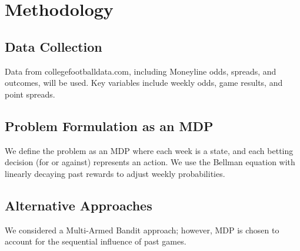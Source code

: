 \section{Methodology}
    \subsection{Data Collection}
    Data from collegefootballdata.com, including Moneyline odds, spreads, and outcomes, will be used. Key variables include weekly odds, game results, and point spreads.

    \subsection{Problem Formulation as an MDP}
    We define the problem as an MDP where each week is a state, and each betting decision (for or against) represents an action. We use the Bellman equation with linearly decaying past rewards to adjust weekly probabilities.
    
    \subsection{Alternative Approaches}
    We considered a Multi-Armed Bandit approach; however, MDP is chosen to account for the sequential influence of past games.